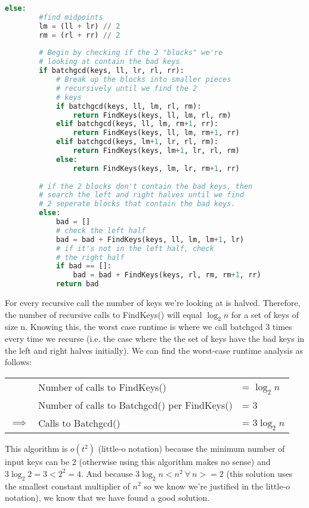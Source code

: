 \documentclass[11pt, letterpaper]{article}
\begin{document}
\begin{enumerate}[label=(\alph*)]
\begin{lstlisting}[language=python]
    else:
        #find midpoints
        lm = (ll + lr) // 2
        rm = (rl + rr) // 2
        
        # Begin by checking if the 2 "blocks" we're
        # looking at contain the bad keys
        if batchgcd(keys, ll, lr, rl, rr):
            # Break up the blocks into smaller pieces
            # recursively until we find the 2 
            # keys
            if batchgcd(keys, ll, lm, rl, rm):
                return FindKeys(keys, ll, lm, rl, rm)
            elif batchgcd(keys, ll, lm, rm+1, rr):
                return FindKeys(keys, ll, lm, rm+1, rr)
            elif batchgcd(keys, lm+1, lr, rl, rm):
                return FindKeys(keys, lm+1, lr, rl, rm)
            else:
                return FindKeys(keys, lm, lr, rm+1, rr)
         
        # if the 2 blocks don't contain the bad keys, then
        # search the left and right halves until we find
        # 2 seperate blocks that contain the bad keys.
        else:
            bad = []
            # check the left half
            bad = bad + FindKeys(keys, ll, lm, lm+1, lr)
            # if it's not in the left half, check 
            # the right half
            if bad == []:
                bad = bad + FindKeys(keys, rl, rm, rm+1, rr)
            return bad
\end{lstlisting}

\quad For every recursive call the number of keys we're looking at is halved. Therefore, the number of recursive calls to FindKeys() will equal $\log_2 n$ for a set of keys of size n. Knowing this, the worst case runtime is where we call batchgcd 3 times every time we recurse (i.e. the case where the the set of keys have the bad keys in the left and right halves initially). We can find the worst-case runtime analysis as follows:

\begin{center}
\begin{tabular}{l l l}
 & Number of calls to FindKeys() &= $\log_2 n$ \\
& Number of calls to Batchgcd() per FindKeys() &= 3 \\
$\implies$ & Calls to Batchgcd() &= $3 \log_2 n $ \\
\end{tabular}
\end{center}

\quad This algorithm is $o(t^2)$ (little-o notation) because the minimum number of input keys can be 2 (otherwise using this algorithm makes no sense) and $3 \log_2 2 = 3 < 2^2 = 4$. And because $3 \log_2 n < n^2\ \forall\ n >= 2$ (this solution uses the smallest constant multiplier of $n^2$ so we know we're justified in the little-o notation), we know that we have found a good solution.

\end{enumerate}
\end{document}
